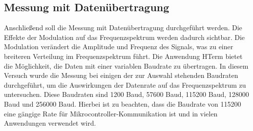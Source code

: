 \subsection{Messung mit Datenübertragung}
Anschließend soll die Messung mit Datenübertragung durchgeführt werden. Die Effekte der Modulation auf das Frequenzspektrum werden dadurch sichtbar. Die Modulation verändert die Amplitude und Frequenz des Signals, was zu einer breiteren Verteilung im Frequenzspektrum führt.
Die Anwendung HTerm bietet die Möglichkeit, die Daten mit einer variablen Baudrate zu übertragen. In diesem Versuch wurde die Messung bei einigen der zur Auswahl stehenden Baudraten durchgeführt, um die Auswirkungen der Datenrate auf das Frequenzspektrum zu untersuchen. Diese Baudraten sind 1200 Baud, 57600 Baud, 115200 Baud, 128000 Baud und 256000 Baud.
Hierbei ist zu beachten, dass die Baudrate von 115200 eine gängige Rate für Mikrocontroller-Kommunikation ist und in vielen Anwendungen verwendet wird.

